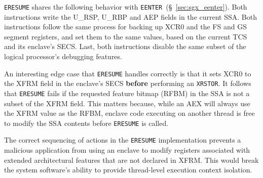 \texttt{ERESUME} shares the following behavior with
\texttt{EENTER}~(\S~\ref{sec:sgx_eenter}). Both instructions write the U\_RSP,
U\_RBP and AEP fields in the current SSA. Both instructions follow the same
process for backing up XCR0 and the FS and GS segment registers, and set them
to the same values, based on the current TCS and its enclave's SECS. Last, both
instructions disable the same subset of the logical processor's debugging
features.

An interesting edge case that \texttt{ERESUME} handles correctly is that it
sets XCR0 to the XFRM field in the enclave's SECS \textbf{before} performing an
\texttt{XRSTOR}. It follows that \texttt{ERESUME} fails if the requested
feature bitmap (RFBM) in the SSA is not a subset of the XFRM field. This
matters because, while an AEX will always use the XFRM value as the RFBM,
enclave code executing on another thread is free to modify the SSA contents
before \texttt{ERESUME} is called.

The correct sequencing of actions in the \texttt{ERESUME} implementation
prevents a malicious application from using an enclave to modify registers
associated with extended architectural features that are not declared in XFRM.
This would break the system software's ability to provide thread-level
execution context isolation.
